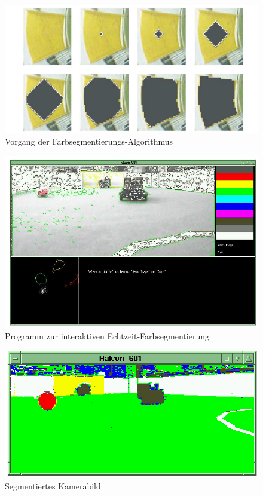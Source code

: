 \documentclass[a4paper,12pt]{article}
\begin{document}
\begin{figure}[H]
\includegraphics[scale=0.9]{region-growing.png}
\caption{Vorgang der Farbsegmentierungs-Algorithmus}
\label{fig:color-seg-algo}
\end{figure}

\begin{figure}[H]
\includegraphics[scale=0.6]{training-tool.png}
\caption{Programm zur interaktiven Echtzeit-Farbsegmentierung}
\label{fig:color-seg-tool}
\end{figure}

\begin{figure}[H]
\includegraphics[scale=0.6]{segmented-view.png}
\caption{Segmentiertes Kamerabild}
\label{fig:color-seg-cam}
\end{figure}
\end{document}
